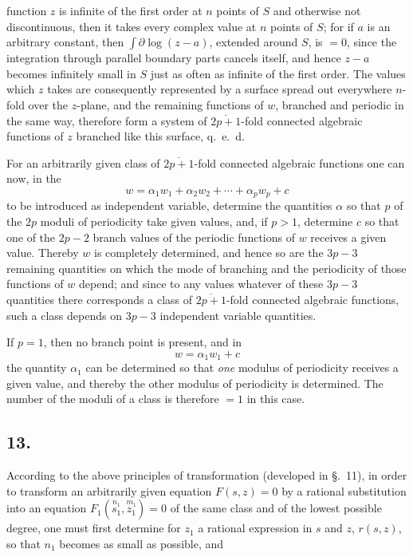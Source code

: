 \documentclass{article}
\begin{document}
function $z$ is infinite of the first order at $n$ points of $S$ and otherwise not discontinuous, then it takes every complex value at $n$ points of $S$; for if $a$ is an arbitrary constant, then $\displaystyle\int \partial \log(z-a)$, extended around $S$, is $= 0$, since the integration through parallel boundary parts cancels itself, and hence $z-a$ becomes infinitely small in $S$ just as often as infinite of the first order. The values which $z$ takes are consequently represented by a surface spread out everywhere $n$-fold over the $z$-plane, and the remaining functions of $w$, branched and periodic in the same way, therefore form a system of $\overline{2p+1}$-fold connected algebraic functions of $z$ branched like this surface, q.~e.~d.

For an arbitrarily given class of $\overline{2p+1}$-fold connected algebraic functions one can now, in the
\[ w = \alpha_{1} w_{1} + \alpha_{2} w_{2} + \cdots + \alpha_{p} w_{p} + c \]
to be introduced as independent variable, determine the quantities $\alpha$ so that $p$ of the $2p$ moduli of periodicity take given values, and, if $p > 1$, determine $c$ so that one of the $2p-2$ branch values of the periodic functions of $w$ receives a given value. Thereby $w$ is completely determined, and hence so are the $3p-3$ remaining quantities on which the mode of branching and the periodicity of those functions of $w$ depend; and since to any values whatever of these $3p-3$ quantities there corresponds a class of $\overline{2p+1}$-fold connected algebraic functions, such a class depends on $3p-3$ independent variable quantities.

If $p = 1$, then no branch point is present, and in
\[ w = \alpha_{1} w_{1} + c \]
the quantity $\alpha_{1}$ can be determined so that \emph{one} modulus of periodicity receives a given value, and thereby the other modulus of periodicity is determined. The number of the moduli of a class is therefore $= 1$ in this case.

\subsection*{13.}

According to the above principles of transformation (developed in §.~11), in order to transform an arbitrarily given equation $F(s, z) = 0$ by a rational substitution into an equation $F_{1}(\overset{n_{1}}{s_{1}}, \overset{m_{1}}{z_{1}}) = 0$ of the same class and of the lowest possible degree, one must first determine for $z_{1}$ a rational expression in $s$ and $z$, $r(s, z)$, so that $n_{1}$ becomes as small as possible, and
\end{document}
